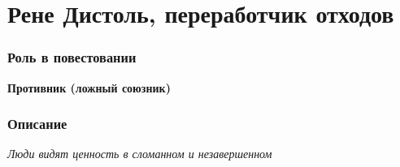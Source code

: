 \clearpage
\part{Рене Дистоль, переработчик отходов}
\section{Роль в повестовании}
\textbf{Противник (ложный союзник)}\\
\section{Описание}
\textit{Люди видят ценность в сломанном и незавершенном}\\



